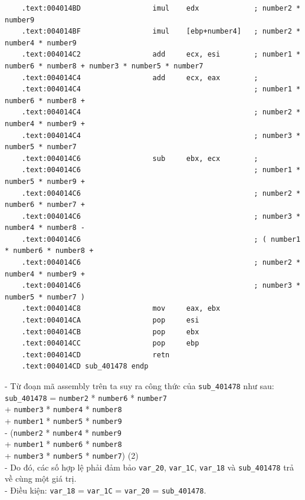 \begin{lstlisting}
	.text:004014BD                 imul    edx             ; number2 * number9
	.text:004014BF                 imul    [ebp+number4]   ; number2 * number4 * number9
	.text:004014C2                 add     ecx, esi        ; number1 * number6 * number8 + number3 * number5 * number7
	.text:004014C4                 add     ecx, eax        ;
	.text:004014C4                                         ; number1 * number6 * number8 +
	.text:004014C4                                         ; number2 * number4 * number9 +
	.text:004014C4                                         ; number3 * number5 * number7
	.text:004014C6                 sub     ebx, ecx        ;
	.text:004014C6                                         ; number1 * number5 * number9 +
	.text:004014C6                                         ; number2 * number6 * number7 +
	.text:004014C6                                         ; number3 * number4 * number8 -
	.text:004014C6                                         ; ( number1 * number6 * number8 +
	.text:004014C6                                         ; number2 * number4 * number9 +
	.text:004014C6                                         ; number3 * number5 * number7 )
	.text:004014C8                 mov     eax, ebx
	.text:004014CA                 pop     esi
	.text:004014CB                 pop     ebx
	.text:004014CC                 pop     ebp
	.text:004014CD                 retn
	.text:004014CD sub_401478 endp
\end{lstlisting}
- Từ đoạn mã assembly trên ta suy ra công thức của \texttt{sub\_401478} như sau: \\
\texttt{sub\_401478} = \texttt{number2} * \texttt{number6} * \texttt{number7} \\+ \texttt{number3} * \texttt{number4} * \texttt{number8} \\+ \texttt{number1} * \texttt{number5} * \texttt{number9}\\ - (\texttt{number2} * \texttt{number4} * \texttt{number9}\\ + \texttt{number1} * \texttt{number6} * \texttt{number8}\\ + \texttt{number3} * \texttt{number5} * \texttt{number7}) (2) \\
- Do đó, các số hợp lệ phải đảm bảo \texttt{var\_20}, \texttt{var\_1C}, \texttt{var\_18} và \texttt{sub\_401478} trả về cùng một giá trị.\\
- Điều kiện: \texttt{var\_18} = \texttt{var\_1C} = \texttt{var\_20} = \texttt{sub\_401478}.

